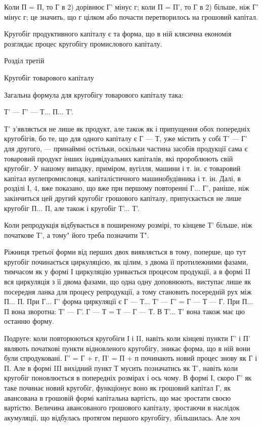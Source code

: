 Коли П = П, то Г в 2) дорівнює Г' мінус г; коли П = П', то Г в 2)
більше, ніж Г' мінус г; це значить, що г цілком або почасти перетворилось
на грошовий капітал.

Кругобіг продуктивного капіталу є та форма, що в ній клясична
економія розглядає процес кругобігу промислового капіталу.

Розділ третій

Кругобіг товарового капіталу

Загальна формула для кругобігу товарового капіталу така:

Т' — Г' — Т... П... Т'.

Т' з’являється не лише як продукт, але також як і припущення обох
попередніх кругобігів, бо те, що для одного капіталу є Г — Т, уже містить
у собі Т' — Г' для другого, — принаймні остільки, оскільки частина засобів
продукції сама є товаровий продукт інших індивідуальних капіталів,
які пророблюють свій кругобіг. У нашому випадку, приміром,
вугілля, машини і т. ін. є товаровий капітал вуглепромисловця, капіталістичного
машинобудівника і т. ін. Далі, в розділі І, 4, вже показано,
що вже при першому повторенні Г... Г', раніше, ніж закінчиться цей
другий кругобіг грошового капіталу, припускається не лише кругобіг
П... П, але також і кругобіг Т'... Т'.

Коли репродукція відбувається в поширеному розмірі, то кінцеве Т'
більше, ніж початкове Т', а тому" його треба позначити Т".

Ріжниця третьої форми від перших двох виявляється в тому, поперше,
що тут кругобіг починається циркуляцією, як цілим, з двома її протилежними
фазами, тимчасом як у формі І циркуляцію уривається процесом
продукції, а в формі II вся циркуляція з її двома фазами, що одна одну
доповнюють, виступає лише як посередня ланка для процесу репродукції,
а тому становить посередній рух між П... П. При Г... Г' форма
циркуляції є Г — Т... Т' — Г' = Г — Т — Г. При П... П вона зворотна:
Т' — Г'. Г — Т = Т — Г — Т. В Т'... Т' вона також має цю останню
форму.

Подруге: коли повторюються кругобіги І і II, навіть коли кінцеві
пункти Г' і П' являють початкові пункти відновленого кругобігу, зникає
форма, що в ній вони були спродуковані. Г' = Г + г, П' = П + п починають
новий процес знову як Г і П. Але в формі III вихідний пункт Т
мусить позначатись як Т', навіть коли кругобіг поновлюється в попередніх
розмірах і ось чому. В формі І, скоро Г' як таке починає новий
кругобіг, функціонує воно як грошовий капітал Г, як авансована в грошовій
формі капітальна вартість, що має зростати своєю вартістю.
Величина авансованого грошового капіталу, зростаючи в наслідок акумуляції,
що відбулась протягом першого кругобігу, збільшилась. Але хоч
\parbreak{}  %
